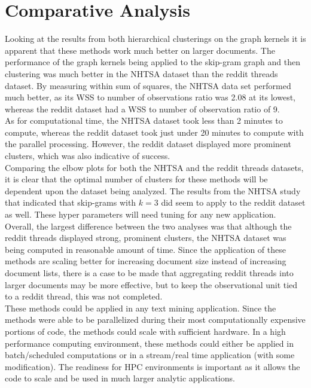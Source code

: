\section{Comparative Analysis}

\hspace*{0.5cm} Looking at the results from both hierarchical clusterings on the graph kernels it is apparent that these methods work much better on larger documents. The performance of the graph kernels being applied to the skip-gram graph and then clustering was much better in the NHTSA dataset than the reddit threads dataset. By measuring within sum of squares, the NHTSA data set performed much better, as its WSS to number of observations ratio was 2.08 at its lowest, whereas the reddit dataset had a WSS to number of observation ratio of 9.\\
 
As for computational time, the NHTSA dataset took less than 2 minutes to compute, whereas the reddit dataset took just under 20 minutes to compute with the parallel processing. However, the reddit dataset displayed more prominent clusters, which was also indicative of success.\\

Comparing the elbow plots for both the NHTSA and the reddit threads datasets, it is clear that the optimal number of clusters for these methods will be dependent upon the dataset being analyzed. The results from the NHTSA study that indicated that skip-grams with $k=3$ did seem to apply to the reddit dataset as well. These hyper parameters will need tuning for any new application.\\

Overall, the largest difference between the two analyses was that although the reddit threads displayed strong, prominent clusters, the NHTSA dataset was being computed in reasonable amount of time. Since the application of these methods are scaling better for increasing document size instead of increasing document lists, there is a case to be made that aggregating reddit threads into larger documents may be more effective, but to keep the observational unit tied to a reddit thread, this was not completed.\\ 

These methods could be applied in any text mining application. Since the methods were able to be parallelized during their most computationally expensive portions of code, the methods could scale with sufficient hardware. In a high performance computing environment, these methods could either be applied in batch/scheduled computations or in a stream/real time application (with some modification). The readiness for HPC environments is important as it allows the code to scale and be used in much larger analytic applications.

